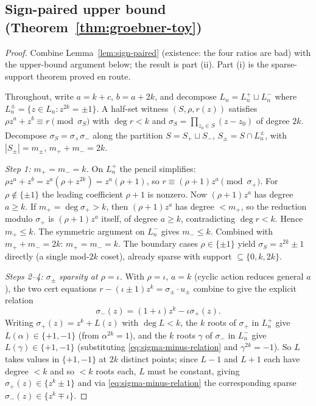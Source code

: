 \documentclass[11pt]{article}
\theoremstyle{definition}
\theoremstyle{remark}
\begin{document}
\subsection{Sign-paired upper bound (Theorem~\ref{thm:groebner-toy})}
\label{prf:thm:groebner-toy}

\begin{proof}
Combine Lemma~\ref{lem:sign-paired} (existence: the four ratios are
bad) with the upper-bound argument below; the result is part (ii). Part
(i) is the sparse-support theorem proved en route.

Throughout, write $a = k+c$, $b = a + 2k$, and decompose
$L_n = L_n^+ \sqcup L_n^-$ where
$L_n^\pm = \{z \in L_n : z^{2k} = \pm 1\}$. A half-set witness
$(S, \rho, r(z))$ satisfies $\rho z^a + z^b \equiv r \pmod{\sigma_S}$
with $\deg r < k$ and $\sigma_S = \prod_{z_0 \in S}(z - z_0)$ of degree
$2k$. Decompose $\sigma_S = \sigma_+ \sigma_-$ along the partition
$S = S_+ \sqcup S_-$, $S_\pm = S \cap L_n^\pm$, with $|S_\pm| = m_\pm$,
$m_+ + m_- = 2k$.

\emph{Step 1: $m_+ = m_- = k$.}
On $L_n^+$ the pencil simplifies: $\rho z^a + z^b = z^a(\rho + z^{2k}) =
z^a(\rho + 1)$, so $r \equiv (\rho+1) z^a \pmod{\sigma_+}$. For $\rho
\notin \{\pm 1\}$ the leading coefficient $\rho + 1$ is nonzero. Now
$(\rho+1) z^a$ has degree $a \geq k$. If $m_+ = \deg \sigma_+ > k$, then
$(\rho+1) z^a$ has degree $< m_+$, so the reduction modulo $\sigma_+$ is
$(\rho+1) z^a$ itself, of degree $a \geq k$, contradicting $\deg r < k$.
Hence $m_+ \leq k$. The symmetric argument on $L_n^-$ gives $m_- \leq
k$. Combined with $m_+ + m_- = 2k$: $m_+ = m_- = k$. The boundary cases
$\rho \in \{\pm 1\}$ yield $\sigma_S = z^{2k} \pm 1$ directly (a single
mod-$2k$ coset), already sparse with support $\subseteq \{0, k, 2k\}$.

\emph{Steps 2--4: $\sigma_\pm$ sparsity at $\rho = \iota$.}
With $\rho = \iota$, $a = k$ (cyclic action reduces general $a$), the
two cert equations $r - (\iota \pm 1)z^k = \sigma_\pm \cdot u_\pm$
combine to give the explicit relation
\begin{equation}
\label{eq:sigma-minus-relation}
   \sigma_-(z) = (1+\iota) z^k - \iota \sigma_+(z).
\end{equation}
Writing $\sigma_+(z) = z^k + L(z)$ with $\deg L < k$, the $k$ roots
of $\sigma_+$ in $L_n^+$ give $L(\alpha) \in \{+1, -1\}$ (from
$\alpha^{2k} = 1$), and the $k$ roots $\gamma$ of $\sigma_-$ in
$L_n^-$ give $L(\gamma) \in \{+1, -1\}$ (substituting
\eqref{eq:sigma-minus-relation} and $\gamma^{2k} = -1$). So $L$ takes
values in $\{+1, -1\}$ at $2k$ distinct points; since $L - 1$ and
$L + 1$ each have degree $< k$ and so $< k$ roots each, $L$ must be
constant, giving $\sigma_+(z) \in \{z^k \pm 1\}$ and via
\eqref{eq:sigma-minus-relation} the corresponding sparse
$\sigma_-(z) \in \{z^k \mp \iota\}$.


\end{proof}
\end{document}
